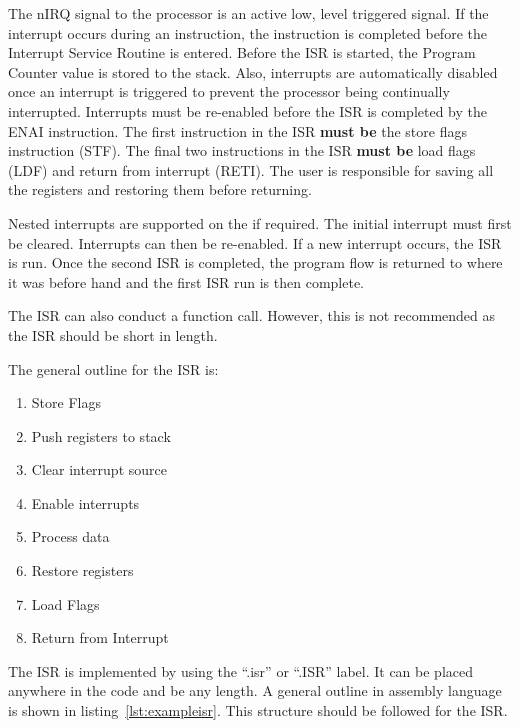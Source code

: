 The nIRQ signal to the \samurai{} processor is an active low, level triggered signal.
If the interrupt occurs during an instruction, the instruction is completed before the Interrupt Service Routine is entered.
Before the ISR is started, the Program Counter value is stored to the stack. 
Also, interrupts are automatically disabled once an interrupt is triggered to prevent the processor being continually interrupted.
Interrupts must be re-enabled before the ISR is completed by the ENAI instruction.
The first instruction in the ISR \textbf{must be} the store flags instruction (STF). 
The final two instructions in the ISR \textbf{must be} load flags (LDF) and return from interrupt (RETI). 
The user is responsible for saving all the registers and restoring them before returning. 

Nested interrupts are supported on the \samurai{} if required. 
The initial interrupt must first be cleared. 
Interrupts can then be re-enabled. 
If a new interrupt occurs, the ISR is run. 
Once the second ISR is completed, the program flow is returned to where it was before hand and the first ISR run is then complete.

The ISR can also conduct a function call. 
However, this is not recommended as the ISR should be short in length.

The general outline for the ISR is:
\begin{enumerate}
\item Store Flags
\item Push registers to stack
\item Clear interrupt source
\item Enable interrupts
\item Process data
\item Restore registers
\item Load Flags
\item Return from Interrupt
\end{enumerate}

The ISR is implemented by using the ``.isr'' or ``.ISR'' label. 
It can be placed anywhere in the code and be any length.
A general outline in assembly language is shown in listing~\ref{lst:exampleisr}. 
This structure should be followed for the ISR.







